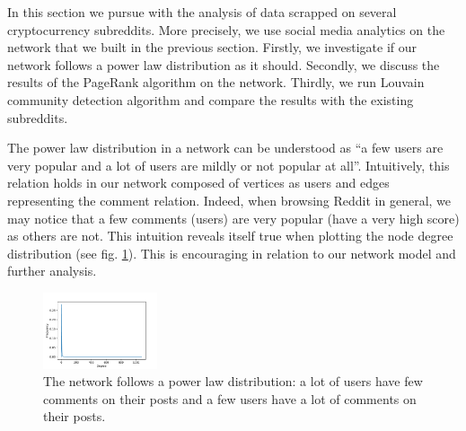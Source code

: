 In this section we pursue with the analysis of data scrapped on several cryptocurrency subreddits. More precisely, we use social media analytics on the network that we built in the previous section. Firstly, we investigate if our network follows a power law distribution as it should. Secondly, we discuss the results of the PageRank algorithm on the network. Thirdly, we run Louvain community detection algorithm and compare the results with the existing subreddits.

The power law distribution in a network can be understood as ``a few users are very popular and a lot of users are mildly or not popular at all''. Intuitively, this relation holds in our network composed of vertices as users and edges representing the comment relation. Indeed, when browsing Reddit in general, we may notice that a few comments (users) are very popular (have a very high score) as others are not. This intuition reveals itself true when plotting the node degree distribution (see fig. \ref{fig:degdist}). This is encouraging in relation to our network model and further analysis.
\begin{figure}[Hb!]
    \centering
    \includegraphics[width=0.3\textwidth]{figures/deg_dist.pdf}
    \caption{The network follows a power law distribution: a lot of users have few comments on their posts and a few users have a lot of comments on their posts.}
    \label{fig:degdist}
\end{figure}
